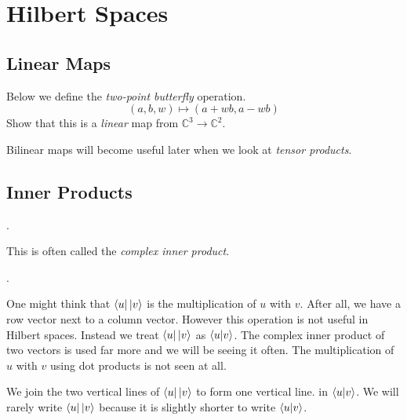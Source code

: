 
\chapter{Hilbert Spaces}


\section{Linear Maps}

\begin{example}
Below we define the \textit{two-point butterfly} operation.
$$(a,b,w) \mapsto (a + wb, a-wb)$$
Show that this is a \textit{linear} map from $\mathbb{C}^3 \rightarrow \mathbb{C}^2$. 
\end{example}




Bilinear maps will become useful later when we look at \textit{tensor products}.

\section{Inner Products}


.

This is often called the \textit{complex inner product}. 




.

One might think that $\left\langle u\right|\left|v\right\rangle$ is the multiplication of $u$ with $v$.
After all, we have a row vector next to a column vector. 
However this operation is not useful in Hilbert spaces.  
Instead we treat $\left\langle u\right|\left|v\right\rangle$ as $\left\langle u | v\right\rangle$. The complex 
inner product of two vectors is used far more and we will be seeing it often. 
The multiplication of $u$ with $v$ using dot products is not seen at all. 

We join the two vertical lines of $\left\langle u\right|\left|v\right\rangle$ to form one vertical line. 
in $\left\langle u | v\right\rangle$. We will rarely write $\left\langle u\right|\left|v\right\rangle$ because it is 
slightly shorter to write $\left\langle u | v\right\rangle$. 